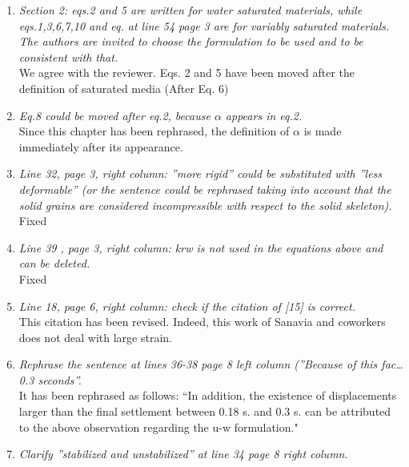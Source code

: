 \documentclass[12pt]{article}
\begin{document}
 \begin{enumerate}
\item \textit{Section 2: eqs.2 and 5 are written for water saturated materials, while eqs.1,3,6,7,10 and eq. at line 54 page 3 are for variably saturated materials. The authors are invited to choose the formulation to be used and to be consistent with that.}\\

We agree with the reviewer. Eqs. 2 and 5 have been moved after the definition of saturated media (After Eq. 6)

\item \textit{Eq.8 could be moved after eq.2, because $\alpha$ appears in eq.2.}\\

Since this chapter has been rephrased, the definition of $\alpha$ is made immediately after its appearance.

\item \textit{Line 32, page 3, right column: ''more rigid'' could be substituted with ''less deformable'' (or the sentence could be rephrased taking into account that the solid grains are considered incompressible with respect to the solid skeleton).}\\

Fixed

\item \textit{Line 39 , page 3, right column: krw is not used in the equations above and can be deleted.}\\

Fixed

\item \textit{Line 18, page 6, right column: check if the citation of [15] is correct.}\\

This citation has been revised. Indeed, this work of Sanavia and coworkers does not deal with large strain.

\item \textit{Rephrase the sentence at lines 36-38 page 8 left column (''Because of this fac… 0.3 seconds''.}\\

It has been rephrased as follows:
``In addition, the existence of displacements larger than the final settlement between 0.18 s. and 0.3 s. can be attributed to the above observation regarding the u-w formulation."

\item \textit{Clarify ''stabilized and unstabilized'' at line 34 page 8 right column.}\\


\end{enumerate}
\end{document}
